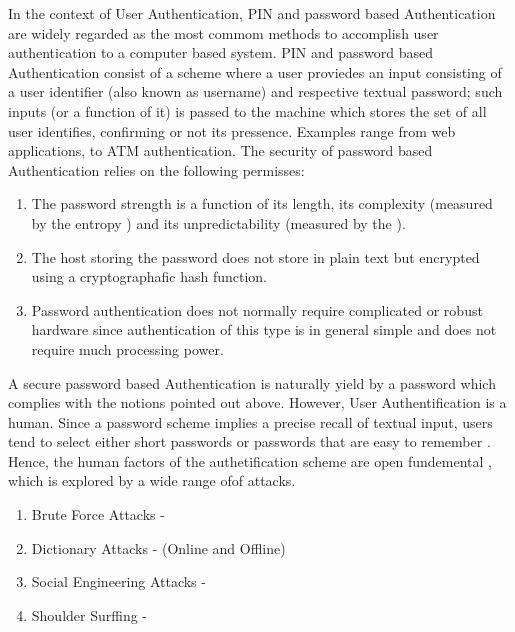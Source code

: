 \documentclass[11pt,a4paper]{article}
\theoremstyle{defn, nobreak=true}
\begin{document}
In the context of User Authentication, PIN and password based Authentication are widely regarded as the most commom methods to accomplish user authentication to a computer based system. PIN and password based Authentication consist of a scheme where a user proviedes an input consisting of a user identifier (also known as username) and respective textual password; such inputs (or a function of it) is passed to the machine which stores the set of all user identifies, confirming or not its pressence. Examples range from web applications, to ATM authentication. The security of password based Authentication relies on the following permisses: 

\begin{enumerate}

\item The password strength is a function of its length, its complexity (measured by the entropy ) and its unpredictability (measured by the ).    

\item The host storing the password does not store in plain text but encrypted using a cryptographafic hash function. 

\item Password authentication does not normally require complicated or robust hardware since authentication of this type is in general simple and does not require much processing power. 

\end{enumerate}

A secure password based Authentication is naturally yield by a password which complies with the notions pointed out above. However, User Authentification is a human. Since a password scheme implies a precise recall of textual input, users tend to select either short passwords or passwords that are easy to remember \cite{} \cite{}. Hence, the human factors of the authetification scheme are open fundemental  , which is explored by a wide range ofof attacks. 

\begin{enumerate}

\item Brute Force Attacks - 

\item Dictionary Attacks - (Online and Offline)

\item Social Engineering Attacks - 

\item Shoulder Surffing - 

\end{enumerate}  
\end{document}
